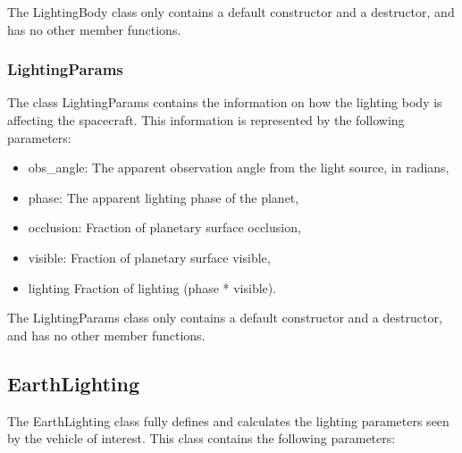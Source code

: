 The LightingBody class only contains a default constructor and a destructor,
and has no other member functions.

\subsubsection{LightingParams}
The class LightingParams contains the information on how the lighting body
is affecting the spacecraft. This information is represented by the
following parameters:

\begin{itemize}
\item{obs\_angle:} The apparent observation angle from the light source,
in radians,
\item{phase:} The apparent lighting phase of the planet,
\item{occlusion:} Fraction of planetary surface occlusion,
\item{visible:} Fraction of planetary surface visible,
\item{lighting} Fraction of lighting (phase * visible).
\end{itemize}

The LightingParams class only contains a default constructor and a
destructor, and has no other member functions.

\subsection{EarthLighting}

The EarthLighting class fully defines and calculates the lighting
parameters seen by the vehicle of interest. This class contains the
following parameters:

